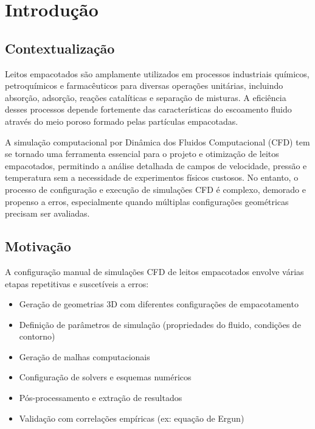 \chapter{Introdução}
\label{cap:introducao}

\section{Contextualização}

Leitos empacotados são amplamente utilizados em processos industriais químicos, petroquímicos e farmacêuticos para diversas operações unitárias, incluindo absorção, adsorção, reações catalíticas e separação de misturas. A eficiência desses processos depende fortemente das características do escoamento fluido através do meio poroso formado pelas partículas empacotadas.

A simulação computacional por Dinâmica dos Fluidos Computacional (CFD) tem se tornado uma ferramenta essencial para o projeto e otimização de leitos empacotados, permitindo a análise detalhada de campos de velocidade, pressão e temperatura sem a necessidade de experimentos físicos custosos. No entanto, o processo de configuração e execução de simulações CFD é complexo, demorado e propenso a erros, especialmente quando múltiplas configurações geométricas precisam ser avaliadas.

\section{Motivação}

A configuração manual de simulações CFD de leitos empacotados envolve várias etapas repetitivas e suscetíveis a erros:

\begin{itemize}
    \item Geração de geometrias 3D com diferentes configurações de empacotamento
    \item Definição de parâmetros de simulação (propriedades do fluido, condições de contorno)
    \item Geração de malhas computacionais
    \item Configuração de solvers e esquemas numéricos
    \item Pós-processamento e extração de resultados
    \item Validação com correlações empíricas (ex: equação de Ergun)
\end{itemize}

